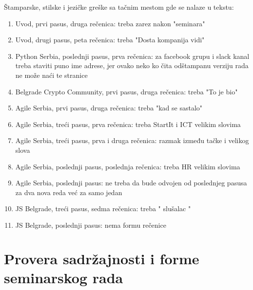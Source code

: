 \documentclass[a4paper]{report}
\begin{document}
Štamparske, stilske i jezičke greške sa tačnim mestom gde se nalaze u tekstu:
\begin{enumerate}
\item Uvod, prvi pasus, druga rečenica: treba zarez nakon "{seminara}"
\item Uvod, drugi pasus, peta rečenica: treba "{Dosta kompanija vidi}"
\item Python Serbia, poslednji pasus, prva rečenica: za facebook grupu i slack kanal treba staviti puno ime adrese, jer ovako neko ko čita odštampanu verziju rada ne može naći te stranice
\item Belgrade Crypto Community, prvi pasus, druga rečenica: treba "To je bio"
\item Agile Serbia, prvi pasus, druga rečenica: treba "kad se sastalo"
\item Agile Serbia, treći pasus, prva rečenica: treba StartIt i ICT velikim slovima
\item Agile Serbia, treći pasus, prva i druga rečenica: razmak između tačke i velikog slova
\item Agile Serbia, poslednji pasus, poslednja rečenica: treba HR velikim slovima
\item Agile Serbia, poslednji pasus: ne treba da bude odvojen od poslednjeg pasusa za dva nova reda već za samo jedan
\item JS Belgrade, treći pasus, sedma rečenica: treba " slušalac "
\item JS Belgrade, poslednji pasus: nema formu rečenice
\end{enumerate}


\section{Provera sadržajnosti i forme seminarskog rada}
\end{document}
